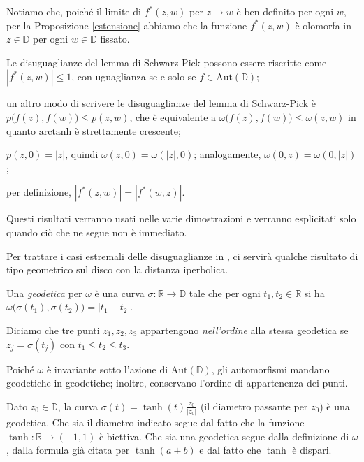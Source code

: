 Notiamo che, poiché il limite di $f^*(z,w)$ per $z \longrightarrow w$ è ben definito per ogni $w$, per la Proposizione \ref{estensione} abbiamo che la funzione $f^*(z,w)$ è olomorfa in $z \in \mathbb{D}$ per ogni $w \in \mathbb{D}$ fissato.

\begin{oss} \label{oss1}
  \begin{nlist}
    \item Le disuguaglianze del lemma di Schwarz-Pick possono essere riscritte come $|f^*(z,w)| \le 1$, con uguaglianza se e solo se $f \in \text{Aut}(\mathbb{D})$;
    \item  un altro modo di scrivere le disuguaglianze del lemma di Schwarz-Pick è $p\bigl(f(z),f(w)\bigr) \le p(z,w)$, che è equivalente a $\omega\bigl(f(z),f(w)\bigr) \le \omega(z,w)$ in quanto $\text{arctanh}$ è strettamente crescente;
    \item $p(z,0)=|z|$, quindi $\omega(z,0)=\omega(|z|,0)$; analogamente, $\omega(0,z)=\omega(0,|z|)$;
    \item per definizione, $|f^*(z,w)|=|f^*(w,z)|$.
  \end{nlist}
  Questi risultati verranno usati nelle varie dimostrazioni e verranno esplicitati solo quando ciò che ne segue non è immediato.
\end{oss}

Per trattare i casi estremali delle disuguaglianze in \cite{BM}, ci servirà qualche risultato di tipo geometrico sul disco con la distanza iperbolica.

\begin{defn}
  Una \textit{geodetica} per $\omega$ è una curva $\sigma: \mathbb{R} \longrightarrow \mathbb{D}$ tale che per ogni $t_1,t_2 \in \mathbb{R}$ si ha $\omega\bigl(\sigma(t_1),\sigma(t_2)\bigr)=|t_1-t_2|$.

  Diciamo che tre punti $z_1, z_2, z_3$ appartengono \textit{nell'ordine} alla stessa geodetica se $z_j=\sigma(t_j)$ con $t_1 \le t_2 \le t_3$.
\end{defn}

\begin{oss} \label{geoingeo}
  Poiché $\omega$ è invariante sotto l'azione di $\text{Aut}(\mathbb{D})$, gli automorfismi mandano geodetiche in geodetiche; inoltre, conservano l'ordine di appartenenza dei punti.
\end{oss}

\begin{ex} \label{diam}
  Dato $z_0 \in \mathbb{D}$, la curva $\sigma(t)=\tanh(t)\frac{z_0}{|z_0|}$ (il diametro passante per $z_0$) è una geodetica. Che sia il diametro indicato segue dal fatto che la funzione $\tanh:\mathbb{R} \longrightarrow (-1,1)$ è biettiva. Che sia una geodetica segue dalla definizione di $\omega$, dalla formula già citata per $\tanh(a+b)$ e dal fatto che $\tanh$ è dispari.
\end{ex}

